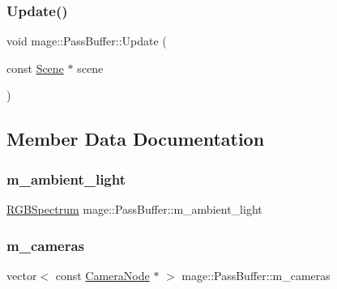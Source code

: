 \subsubsection{\texorpdfstring{Update()}{Update()}}
{\footnotesize\ttfamily void mage\+::\+Pass\+Buffer\+::\+Update (\begin{DoxyParamCaption}\item[{const \hyperlink{classmage_1_1_scene}{Scene} $\ast$}]{scene }\end{DoxyParamCaption})}



\subsection{Member Data Documentation}
\hypertarget{structmage_1_1_pass_buffer_a311ad723470aff0ad80c325d9ead07b9}{}\label{structmage_1_1_pass_buffer_a311ad723470aff0ad80c325d9ead07b9} 
\subsubsection{\texorpdfstring{m\+\_\+ambient\+\_\+light}{m\_ambient\_light}}
{\footnotesize\ttfamily \hyperlink{structmage_1_1_r_g_b_spectrum}{R\+G\+B\+Spectrum} mage\+::\+Pass\+Buffer\+::m\+\_\+ambient\+\_\+light}

\hypertarget{structmage_1_1_pass_buffer_a4885440342be6a2cd11002781704a63f}{}\label{structmage_1_1_pass_buffer_a4885440342be6a2cd11002781704a63f} 
\subsubsection{\texorpdfstring{m\+\_\+cameras}{m\_cameras}}
{\footnotesize\ttfamily vector$<$ const \hyperlink{classmage_1_1_camera_node}{Camera\+Node} $\ast$ $>$ mage\+::\+Pass\+Buffer\+::m\+\_\+cameras}

\hypertarget{structmage_1_1_pass_buffer_a20f2a4518ea6121e6c9ae0ed9d263435}{}\label{structmage_1_1_pass_buffer_a20f2a4518ea6121e6c9ae0ed9d263435} 
